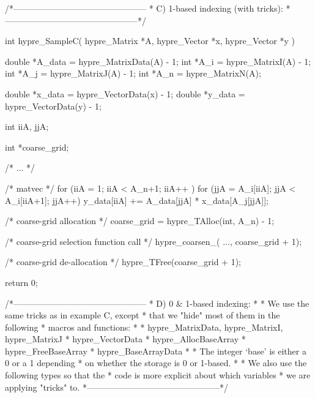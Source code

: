 /*-----------------------------------------------
 * C) 1-based indexing (with tricks):
 *-----------------------------------------------*/

int
hypre_SampleC( hypre_Matrix *A,
               hypre_Vector *x,
               hypre_Vector *y )
{
   double  *A_data = hypre_MatrixData(A) - 1;
   int     *A_i    = hypre_MatrixI(A) - 1;
   int     *A_j    = hypre_MatrixJ(A) - 1;
   int     *A_n    = hypre_MatrixN(A);

   double  *x_data = hypre_VectorData(x) - 1;
   double  *y_data = hypre_VectorData(y) - 1;

   int      iiA, jjA;

   int     *coarse_grid;

   /* ... */

   /* matvec */
   for (iiA = 1; iiA < A_n+1; iiA++ )
   {
      for (jjA = A_i[iiA]; jjA < A_i[iiA+1]; jjA++)
      {
         y_data[iiA] += A_data[jjA] * x_data[A_j[jjA]];
      }
   }

   /* coarse-grid allocation */
   coarse_grid = hypre_TAlloc(int, A_n) - 1;

   /* coarse-grid selection function call */
   hypre_coarsen_( ..., coarse_grid + 1);

   /* coarse-grid de-allocation */
   hypre_TFree(coarse_grid + 1);

   return 0;
}

/*-----------------------------------------------
 * D) 0 & 1-based indexing:
 *
 * We use the same tricks as in example C, except
 * that we "hide" most of them in the following
 * macros and functions:
 *
 * hypre_MatrixData, hypre_MatrixI, hypre_MatrixJ
 * hypre_VectorData
 * hypre_AllocBaseArray
 * hypre_FreeBaseArray
 * hypre_BaseArrayData
 *
 * The integer `base' is either a 0 or a 1 depending
 * on whether the storage is 0 or 1-based.
 *
 * We also use the following types so that the
 * code is more explicit about which variables
 * we are applying "tricks" to.
 *-----------------------------------------------*/

